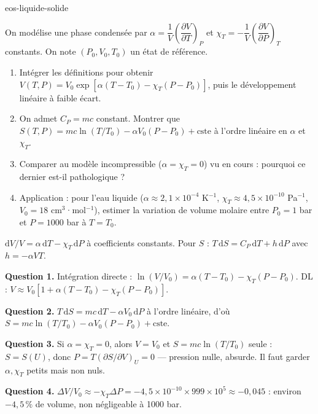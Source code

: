 \begin{exo}{eos-liquide-solide}

On modélise une phase condensée par $\alpha = \dfrac{1}{V}\left(\dfrac{\partial V}{\partial T}\right)_P$ et $\chi_T = -\dfrac{1}{V}\left(\dfrac{\partial V}{\partial P}\right)_T$ constants. On note $(P_0, V_0, T_0)$ un état de référence.

\begin{enumerate}
\item Intégrer les définitions pour obtenir $V(T,P) = V_0 \exp\!\left[\alpha(T-T_0) - \chi_T(P-P_0)\right]$, puis le développement linéaire à faible écart.
\item On admet $C_P = m c$ constant. Montrer que $S(T,P) = mc\ln(T/T_0) - \alpha V_0 (P-P_0) + \text{cste}$ à l'ordre linéaire en $\alpha$ et $\chi_T$.
\item Comparer au modèle incompressible ($\alpha = \chi_T = 0$) vu en cours : pourquoi ce dernier est-il pathologique ?
\item Application : pour l'eau liquide ($\alpha \approx 2{,}1\times10^{-4}$ K$^{-1}$, $\chi_T \approx 4{,}5\times10^{-10}$ Pa$^{-1}$, $V_0 = 18$ cm$^3$·mol$^{-1}$), estimer la variation de volume molaire entre $P_0 = 1$ bar et $P = 1000$ bar à $T = T_0$.
\end{enumerate}

\begin{indication}
$\mathrm{d}V/V = \alpha\,\mathrm{d}T - \chi_T\,\mathrm{d}P$ à coefficients constants. Pour $S$ : $T\,\mathrm{d}S = C_P\,\mathrm{d}T + h\,\mathrm{d}P$ avec $h = -\alpha VT$.
\end{indication}

\begin{solution}
\textbf{Question 1.} Intégration directe : $\ln(V/V_0) = \alpha(T-T_0) - \chi_T(P-P_0)$. DL : $V \approx V_0[1 + \alpha(T-T_0) - \chi_T(P-P_0)]$.

\textbf{Question 2.} $T\,\mathrm{d}S = mc\,\mathrm{d}T - \alpha V_0\,\mathrm{d}P$ à l'ordre linéaire, d'où $S = mc\ln(T/T_0) - \alpha V_0(P-P_0) + \text{cste}$.

\textbf{Question 3.} Si $\alpha = \chi_T = 0$, alors $V = V_0$ et $S = mc\ln(T/T_0)$ seule : $S = S(U)$, donc $P = T(\partial S/\partial V)_U = 0$ — pression nulle, absurde. Il faut garder $\alpha, \chi_T$ petits mais non nuls.

\textbf{Question 4.} $\Delta V/V_0 \approx -\chi_T \Delta P = -4{,}5\times10^{-10} \times 999\times10^5 \approx -0{,}045$ : environ $-4{,}5\,\%$ de volume, non négligeable à 1000 bar.
\end{solution}
\end{exo}

